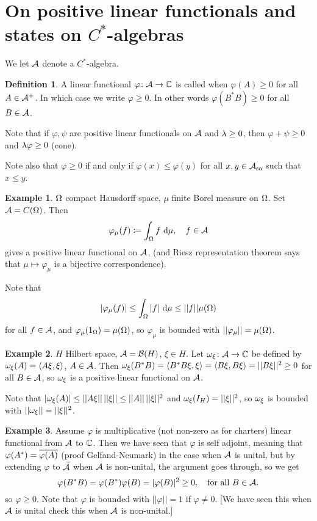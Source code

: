 \documentclass[10pt,english,a4paper]{article}
\theoremstyle{definition}
\newtheorem*{definition}{Definition}
\newtheorem*{example}{Example}
\let\emph\relax %
\def\tAs{\widetilde{\As}}
\def\Assa{\As_{\text{sa}}}
\begin{document}
\section{On positive linear functionals and states on $C^*$-algebras}
We let $\mathcal{A}$ denote a $C^*$-algebra.
\begin{definition}
    A linear functional $\varphi\colon \mathcal{A} \to \mathbb{C}$ is called \emph{positive}
when $\varphi(A)\geq 0$ for all $A \in \mathcal{A}^+$. In which case we write 
$\varphi \geq 0$. In other words $\varphi(B^*B) \geq 0$ for all $B \in \mathcal{A}$.
\end{definition}
Note that if $\varphi,\psi$ are positive linear functionals on  $\mathcal{A}$ and 
$\lambda \geq 0$, then $\varphi + \psi \geq 0$ and $\lambda\varphi \geq 0$ (cone).

Note also that $\varphi \geq 0$ if and only if $\varphi(x)\leq \varphi(y)$
for all $x,y \in \Assa$ such that $x \leq y$. 
\begin{example}
    $\Omega$ compact Hausdorff space, $\mu$ finite Borel measure on $\Omega$.
Set $\mathcal{A} = C(\Omega)$. Then 
\[ \varphi_{\mu}(f) \coloneqq \int_{\Omega} f ~\text{d} \mu , \quad f \in \mathcal{A}\]
gives a positive linear functional on $\mathcal{A}$, (and 
Riesz representation theorem says that $\mu \mapsto \varphi_{\mu}$ is a 
bijective correspondence).

Note that 
\[ |\varphi_{\mu}(f)| \leq \int_{\Omega}|f|~\text{d} \mu \leq ||f|| \mu(\Omega) \]
for all $f \in \mathcal{A}$, and $\varphi_{\mu} (1_{\Omega}) = \mu(\Omega)$,
so $\varphi_{\mu}$ is bounded with $||\varphi_{\mu}|| = \mu(\Omega)$.
\end{example}
\begin{example}
    $H$ Hilbert space, $\mathcal{A} = \mathcal{B}(H)$, $\xi \in H$.
Let $\omega_{\xi}\colon \mathcal{A} \to \mathbb{C}$ be defined by 
$\omega_{\xi}(A) = \left\langle A\xi,\xi \right\rangle$, $A \in \mathcal{A}$. Then 
$\omega_{\xi}(B^*B)= \left\langle B^*B\xi,\xi \right\rangle = \left\langle B\xi,B\xi \right\rangle = ||B\xi||^2 \geq 0$
for all $B \in \mathcal{A}$, so $\omega_{\xi}$ is a positive linear functional on $\mathcal{A}$.

Note that $|\omega_{\xi}(A)| \leq ||A\xi||\,||\xi|| \leq ||A||\,||\xi||^2$ 
and $\omega_{\xi}(I_{H}) = ||\xi||^2$, so $\omega_{\xi}$ is bounded with $||\omega_{\xi}|| = ||\xi||^2$.

\end{example}

\begin{example}
    Assume $\varphi$ is multiplicative (not non-zero as for charters) linear 
functional from $\mathcal{A}$ to $\mathbb{C}$. Then we have seen that $\varphi$ is self 
adjoint, meaning that $\varphi(A^*) = \overline{\varphi(A)}$ (proof Gelfand-Neumark)
in the case when $\mathcal{A}$ is unital, but by extending $\varphi$ to $\tAs$ when $\mathcal{A}$
is non-unital, the argument goes through, so we get 
\[\varphi(B^*B) = \varphi(B^*)\varphi(B) = |\varphi(B)|^2 \geq 0, \quad
\text{for all }B\in \mathcal{A}.\]
so $\varphi \geq 0$. Note that $\varphi$ is bounded with $||\varphi|| = 1$
if $\varphi \neq 0$.
[We have seen this when $\mathcal{A}$ is unital check this when $\mathcal{A}$ is non-unital.]
\end{example}
\end{document}
